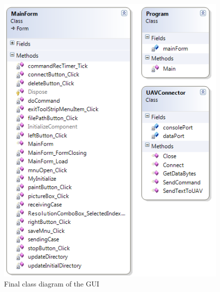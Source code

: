 \begin{figure}[!hbtp]
\begin{center}
\includegraphics[scale=0.7]{figures/finalClassDiagram.png} 
\end{center}
\caption{Final class diagram of the GUI\label{GUI_finalClassDiagram}}
\end{figure}

